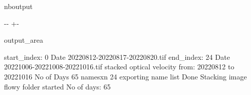 \documentclass[letterpaper,10pt]{sphinxmanual}
\newlength\nbsphinxcodecellspacing
\begin{document}
\begin{sphinxuseclass}{nboutput}
{

\kern-\sphinxverbatimsmallskipamount\kern-\baselineskip
\kern+\FrameHeightAdjust\kern-\fboxrule
\vspace{\nbsphinxcodecellspacing}

\begin{sphinxuseclass}{output_area}
\begin{sphinxuseclass}{}


\begin{sphinxVerbatim}[commandchars=\\\{\}]
start\_index:  0 Date 20220812-20220817-20220820.tif
end\_index:  24 Date 20221006-20221008-20221016.tif
stacked optical velocity from: 20220812 to 20221016
No of Days 65
namesxn 24
exporting name list Done
Stacking image flowy folder started
No of days:  65
\end{sphinxVerbatim}



\end{sphinxuseclass}
\end{sphinxuseclass}
}

\end{sphinxuseclass}
\end{document}
